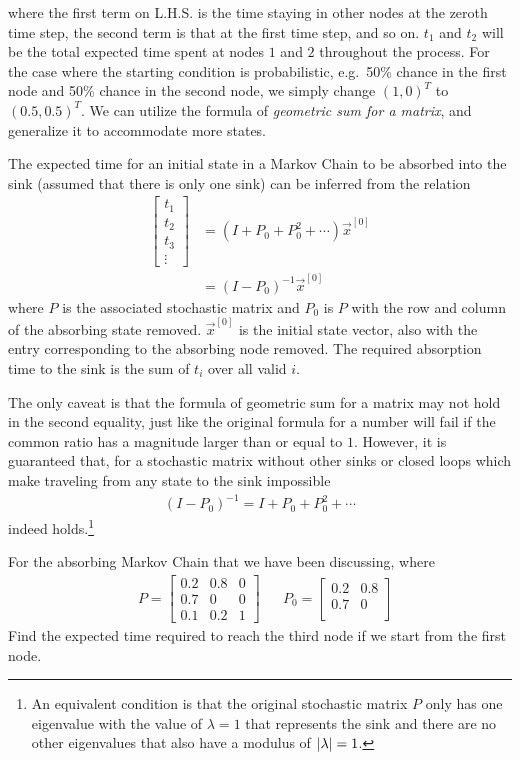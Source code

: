 where the first term on L.H.S. is the time staying in other nodes at the zeroth time step, the second term is that at the first time step, and so on. $t_1$ and $t_2$ will be the total expected time spent at nodes $1$ and $2$ throughout the process. For the case where the starting condition is probabilistic, e.g.\ 50\% chance in the first node
and 50\% chance in the second node, we simply change $(1,0)^T$ to $(0.5,0.5)^T$. We can utilize the formula of \textit{geometric sum for a matrix}, and generalize it to accommodate more states.
\begin{proper}
The expected time for an initial state in a Markov Chain to be absorbed into the sink (assumed that there is only one sink) can be inferred from the relation
\begin{subequations}
\begin{align}
\begin{bmatrix}
t_1 \\
t_2 \\
t_3 \\
\vdots 
\end{bmatrix}
&= (I + P_0 + P_0^2 + \cdots)\vec{x}^{[0]} \\
&= (I - P_0)^{-1}
\vec{x}^{[0]}
\end{align}    
\end{subequations}
where $P$ is the associated stochastic matrix and $P_0$ is $P$ with the row and column of the absorbing state removed. $\vec{x}^{[0]}$ is the initial state vector, also with the entry corresponding to the absorbing node removed. The required absorption time to the sink is the sum of $t_i$ over all valid $i$. 
\end{proper}
The only caveat is that the formula of geometric sum for a matrix may not hold in the second equality, just like the original formula for a number will fail if the common ratio has a magnitude larger than or equal to $1$. However, it is guaranteed that, for a stochastic matrix without other sinks or closed loops which make traveling from any state to the sink impossible
\begin{align}
(I - P_0)^{-1} = I + P_0 + P_0^2 + \cdots    
\end{align}
indeed holds.\footnote{An equivalent condition is that the original stochastic matrix $P$ only has one eigenvalue with the value of $\lambda = 1$ that represents the sink and there are no other eigenvalues that also have a modulus of $\abs{\lambda} = 1$.}
\begin{exmp}
For the absorbing Markov Chain that we have been discussing, where
\begin{align*}
& P = 
\begin{bmatrix}
0.2 & 0.8 & 0 \\
0.7 & 0 & 0 \\
0.1 & 0.2 & 1
\end{bmatrix}
&
& P_0 = 
\begin{bmatrix}
0.2 & 0.8\\
0.7 & 0 \\
\end{bmatrix}   
\end{align*}
Find the expected time required to reach the third node if we start from the first node.
\end{exmp}
